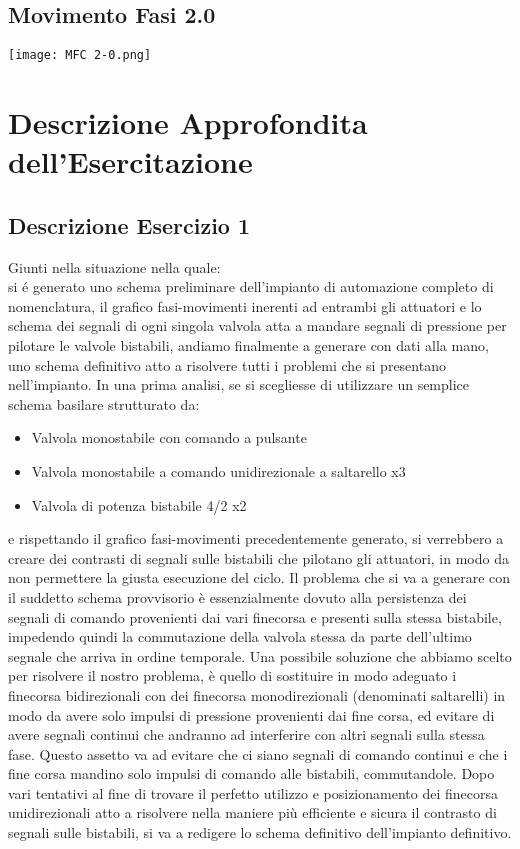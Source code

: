\documentclass[a4paper]{article}
\begin{document}
\subsection{Movimento Fasi 2.0}
\begin{center}
\texttt{[image: MFC 2-0.png]}
\end{center}

\section{Descrizione Approfondita dell'Esercitazione}
\subsection{Descrizione Esercizio 1}

Giunti nella situazione nella quale: \\
si \'e generato uno schema preliminare dell'impianto di automazione completo di nomenclatura, il grafico fasi-movimenti inerenti ad entrambi gli attuatori e lo schema dei segnali di ogni singola valvola atta a mandare segnali di pressione per pilotare le valvole bistabili, andiamo finalmente a generare con dati alla mano, uno schema definitivo atto a risolvere tutti i problemi che si presentano nell'impianto. 
In una prima analisi, se si scegliesse di utilizzare un semplice schema basilare strutturato da:
\begin{itemize}
\item Valvola monostabile con comando a pulsante
\item Valvola monostabile a comando unidirezionale a saltarello x3
\item Valvola di potenza bistabile 4/2 x2
\end{itemize}
e rispettando il grafico fasi-movimenti precedentemente generato, si verrebbero a creare dei contrasti di segnali sulle bistabili che pilotano gli attuatori, in modo da non permettere la giusta esecuzione del ciclo. Il problema che si va a generare con il suddetto schema provvisorio è essenzialmente dovuto alla persistenza dei segnali di comando provenienti dai vari finecorsa e presenti sulla stessa bistabile, impedendo quindi la commutazione della valvola stessa da parte dell'ultimo segnale che arriva in ordine temporale. 
Una possibile soluzione che abbiamo scelto per risolvere il nostro problema, è quello di sostituire in modo adeguato i finecorsa bidirezionali con dei finecorsa monodirezionali (denominati saltarelli) in modo da avere solo impulsi di pressione provenienti dai fine corsa, ed evitare di avere segnali continui che andranno ad interferire con altri segnali sulla stessa fase. Questo assetto va ad evitare che ci siano segnali di comando continui e che i fine corsa mandino solo impulsi di comando alle bistabili, commutandole.
Dopo vari tentativi al fine di trovare il perfetto utilizzo e posizionamento dei finecorsa unidirezionali atto a risolvere nella maniere più efficiente e sicura il contrasto di segnali sulle bistabili, si va a redigere lo schema definitivo dell'impianto definitivo.
\end{document}
